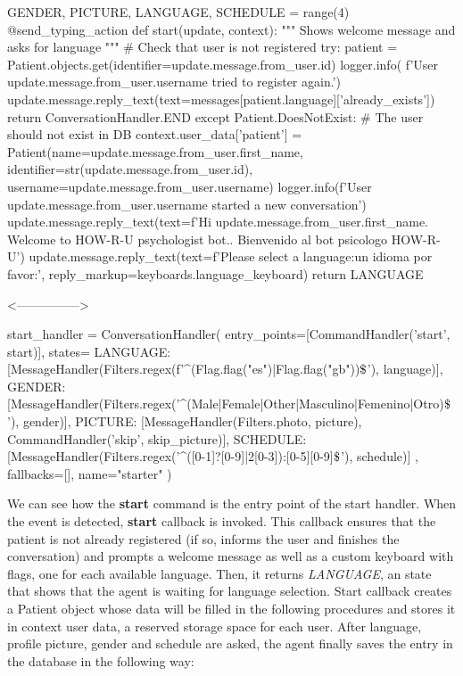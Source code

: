 \documentclass[12pt,english]{article}
\newcommand{\dollar}{\mbox{\textdollar}}
\begin{document}
\begin{python}[caption={Patient start callback}, captionpos=b]
GENDER, PICTURE, LANGUAGE, SCHEDULE = range(4)
@send_typing_action
def start(update, context):
    """
    Shows welcome message and asks for language
    """
    # Check that user is not registered
    try:
        patient = Patient.objects.get(identifier=update.message.from_user.id)
        logger.info(
            f'User {update.message.from_user.username} tried to register again.')
        update.message.reply_text(text=messages[patient.language]['already_exists'])
        return ConversationHandler.END
    except Patient.DoesNotExist:
        # The user should not exist in DB
        context.user_data['patient'] = Patient(name=update.message.from_user.first_name, identifier=str(update.message.from_user.id), username=update.message.from_user.username)
        logger.info(f'User {update.message.from_user.username} started a new conversation')
        update.message.reply_text(text=f'Hi {update.message.from_user.first_name}. Welcome to HOW-R-U psychologist bot.. Bienvenido al bot psicologo HOW-R-U')
        update.message.reply_text(text=f'Please select a language:\nElija un idioma por favor:', reply_markup=keyboards.language_keyboard)
    return LANGUAGE

  <--------------->

  start_handler = ConversationHandler(
      entry_points=[CommandHandler('start', start)],
      states={
          LANGUAGE: [MessageHandler(Filters.regex(f'^({Flag.flag("es")}|{Flag.flag("gb")})$\dollar$'), language)],
          GENDER: [MessageHandler(Filters.regex('^(Male|Female|Other|Masculino|Femenino|Otro)$\dollar$'), gender)],
          PICTURE: [MessageHandler(Filters.photo, picture), CommandHandler('skip', skip_picture)],
          SCHEDULE: [MessageHandler(Filters.regex('^([0-1]?[0-9]|2[0-3]):[0-5][0-9]$\dollar$'), schedule)]
      },
      fallbacks=[],
      name="starter"
  )
\end{python}

We can see how the \textbf{start} command is the entry point of the start handler. When the event is detected, \textbf{start} callback is invoked. This callback ensures that the patient is not already registered (if so, informs the user and finishes the conversation) and prompts a welcome message as well as a custom keyboard with flags, one for each available language. Then, it returns \emph{LANGUAGE}, an state that shows that the agent is waiting for language selection. Start callback creates a Patient object whose data will be filled in the following procedures and stores it in context user data, a reserved storage space for each user. After language, profile picture, gender and schedule are asked, the agent finally saves the entry in the database in the following way:
\end{document}
